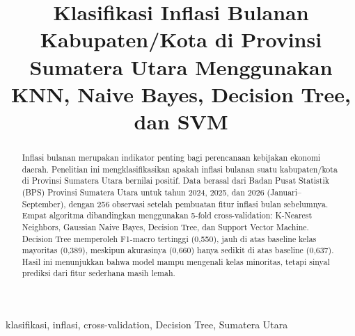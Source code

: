 \documentclass[conference]{IEEEtran}
\begin{document}
\title{Klasifikasi Inflasi Bulanan Kabupaten/Kota di Provinsi Sumatera Utara Menggunakan KNN, Naive Bayes, Decision Tree, dan SVM}

\author{
\and
{}
\and
{}
}

\maketitle

\begin{abstract}
Inflasi bulanan merupakan indikator penting bagi perencanaan kebijakan ekonomi daerah. Penelitian ini mengklasifikasikan apakah inflasi bulanan suatu kabupaten/kota di Provinsi Sumatera Utara bernilai positif. Data berasal dari Badan Pusat Statistik (BPS) Provinsi Sumatera Utara untuk tahun 2024, 2025, dan 2026 (Januari--September), dengan 256 observasi setelah pembuatan fitur inflasi bulan sebelumnya. Empat algoritma dibandingkan menggunakan 5-fold cross-validation: K-Nearest Neighbors, Gaussian Naive Bayes, Decision Tree, dan Support Vector Machine. Decision Tree memperoleh F1-macro tertinggi (0,550), jauh di atas baseline kelas mayoritas (0,389), meskipun akurasinya (0,660) hanya sedikit di atas baseline (0,637). Hasil ini menunjukkan bahwa model mampu mengenali kelas minoritas, tetapi sinyal prediksi dari fitur sederhana masih lemah.
\end{abstract}

\begin{IEEEkeywords}
klasifikasi, inflasi, cross-validation, Decision Tree, Sumatera Utara
\end{IEEEkeywords}
\end{document}
